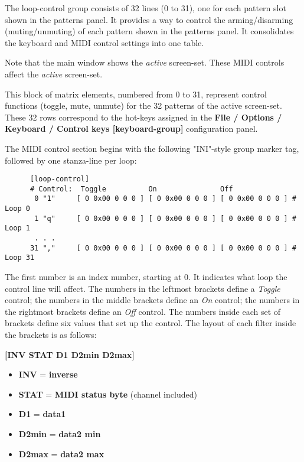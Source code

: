    The loop-control group consists of 32 lines (0 to 31), one for each
   pattern slot shown in the patterns panel.
   It provides a way to control the arming/disarming (muting/unmuting) of
   each pattern shown in the patterns panel.
   It consolidates the keyboard and MIDI control settings into one table.

   Note that the main window shows the \textsl{active} screen-set.
   These MIDI controls affect the \textsl{active} screen-set.

   This block of matrix elements, numbered from 0 to 31,
   represent control functions (toggle, mute, unmute) for the 32 patterns
   of the active screen-set.
   These 32 rows correspond to the hot-keys assigned in
   the \textbf{File / Options / Keyboard / Control keys [keyboard-group]} 
   configuration panel.

   The MIDI control section begins with the following "INI"-style
   group marker tag, followed by one stanza-line per loop:

   \begin{verbatim}
      [loop-control]
      # Control:  Toggle          On               Off
       0 "1"     [ 0 0x00 0 0 0 ] [ 0 0x00 0 0 0 ] [ 0 0x00 0 0 0 ] # Loop 0
       1 "q"     [ 0 0x00 0 0 0 ] [ 0 0x00 0 0 0 ] [ 0 0x00 0 0 0 ] # Loop 1
       . . .
      31 ","     [ 0 0x00 0 0 0 ] [ 0 0x00 0 0 0 ] [ 0 0x00 0 0 0 ] # Loop 31
   \end{verbatim}

   The first number is an index number, starting at 0.  It indicates what
   loop the control line will affect.
   The numbers in the leftmost brackets define a \textsl{Toggle} control;
   the numbers in the middle brackets define an \textsl{On} control;
   the numbers in the rightmost brackets define an \textsl{Off} control.
   The numbers inside each set of brackets define six values that set up the
   control.  The layout of each filter inside the brackets is as follows:

      \textbf{[INV STAT D1 D2min D2max]}

   \begin{itemize}
      \item \textbf{INV} = \textbf{inverse}
      \item \textbf{STAT} = \textbf{MIDI status byte} (channel included) 
      \item \textbf{D1} = \textbf{data1}
      \item \textbf{D2min} = \textbf{data2 min}
      \item \textbf{D2max} = \textbf{data2 max}
   \end{itemize}

